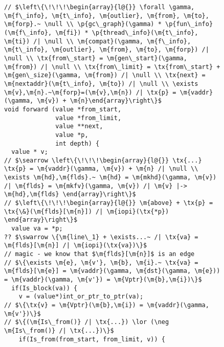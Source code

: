 % 
\begin{figure}[t]
\vspace{-1ex}
  \begin{lstlisting}
// $\left\{\!\!\!\begin{array}{l@{}} \forall \gamma, \m{f\_info}, \m{t\_info}, \m{outlier}, \m{from}, \m{to}, \m{forp}.~ \null \\ \p{gc\_graph}(\gamma) * \p{fun\_info}(\m{f\_info}, \m{fi}) * \p{thread\_info}(\m{t\_info}, \m{ti}) /| \null \\ \m{compat}(\gamma, \m{f\_info}, \m{t\_info}, \m{outlier}, \m{from}, \m{to}, \m{forp}) /| \null \\ \tx{from\_start} = \m{gen\_start}(\gamma, \m{from}) /| \null \\ \tx{from\_limit} = \tx{from\_start} + \m{gen\_size}(\gamma, \m{from}) /| \null \\ \tx{next} = \m{nextaddr}(\m{t\_info}, \m{to}) /| \null \\ \exists \m{v},\m{n}.~\m{forp}=(\m{v},\m{n}) /| \tx{p} = \m{vaddr}(\gamma, \m{v}) + \m{n}\end{array}\right\}$
void forward (value *from_start,
              value *from_limit,
              value **next,
              value *p,
              int depth) {
  value * v;
// $\searrow \left\{\!\!\!\begin{array}{l@{}} \tx{...} \tx{p} = \m{vaddr}(\gamma, \m{v}) + \m{n} /| \null \\ \exists \m{hd},\m{flds}.~ \m{hd} = \m{mkhd}(\gamma, \m{v}) /| \m{flds} = \m{mkfv}(\gamma, \m{v}) /| \m{v} |-> \m{hd},\m{flds} \end{array}\right\}$
// $\left\{\!\!\!\begin{array}{l@{}} \m{above} + \tx{p} = \tx{\&}(\m{flds}[\m{n}]) /| \m{iopi}(\tx{*p}) \end{array}\right\}$
  value va = *p; 
?? $\swarrow \{\m{line\_1} + \exists...~ /| \tx{va} = \m{flds}[\m{n}] /| \m{iopi}(\tx{va})\}$
// magic - we know that $\m{flds}[\m{n}]$ is an edge
// $\{\exists \m{e}, \m{v'}, \m{b}, \m{i}.~ \tx{va} = \m{flds}[\m{e}] = \m{vaddr}(\gamma, \m{dst}(\gamma, \m{e})) = \m{vaddr}(\gamma, \m{v'}) = \m{Vptr}(\m{b},\m{i})\}$
  if(Is_block(va)) {
    v = (value*)int_or_ptr_to_ptr(va);
// $\{\tx{v} = \m{Vptr}(\m{b},\m{i}) = \m{vaddr}(\gamma, \m{v'})\}$
// $\{(\m{Is\_from()} /| \tx{...}) \lor (\neg \m{Is\_from()} /| \tx{...})\}$
    if(Is_from(from_start, from_limit, v)) {

\end{lstlisting}
\end{figure}
